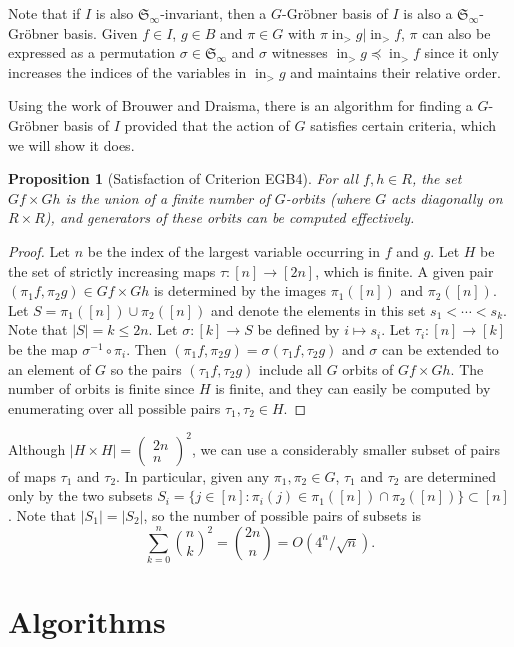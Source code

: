 \documentclass{amsart}
\newtheorem{proposition}[theorem]{Proposition}
\theoremstyle{definition}
\theoremstyle{remark}
\numberwithin{equation}{section}
\newcommand{\binomial}[2]{\left( 
\begin{array}{c} {#1} \\
                        {#2} \end{array} \right)}
\newcommand{\<}{\langle}
\renewcommand{\>}{\rangle}
\newcommand{\LT}{\operatorname{in}_>}
\begin{document}
Note that if $I$ is also ${\mathfrak S}_\infty$-invariant, then a $G$-Gr\"obner basis of $I$ is also a ${\mathfrak S}_\infty$-Gr\"obner basis.  Given $f \in I$, $g \in B$ and $\pi \in G$ with $\pi \LT{g}|\LT{f}$, $\pi$ can also be expressed as a permutation $\sigma \in {\mathfrak S}_\infty$ and $\sigma$ witnesses $\LT{g} \preceq \LT{f}$ since it only increases the indices of the variables in $\LT{g}$ and maintains their relative order.

Using the work of Brouwer and Draisma, there is an algorithm for finding a $G$-Gr\"obner basis of $I$ provided that the action of $G$ satisfies certain criteria, which we will show it does.
\begin{proposition}[Satisfaction of Criterion EGB4]
 For all $f,h \in R$, the set $Gf \times Gh$ is the union of a finite number of $G$-orbits (where $G$ acts diagonally on $R \times R$), and generators of these orbits can be computed effectively.
\end{proposition}
\begin{proof}
 Let $n$ be the index of the largest variable occurring in $f$ and $g$.  Let $H$ be the set of strictly increasing maps $\tau:[n] \to [2n]$, which is finite.  A given pair $(\pi_1 f, \pi_2 g) \in Gf \times Gh$ is determined by the images $\pi_1([n])$ and $\pi_2([n])$.  Let $S = \pi_1([n]) \cup \pi_2([n])$ and denote the elements in this set $s_1 < \cdots < s_k$.  Note that $|S| = k \leq 2n$.  Let $\sigma:[k] \to S$ be defined by $i \mapsto s_i$.  Let $\tau_i:[n] \to [k]$ be the map $\sigma^{-1} \circ \pi_i$.  Then $(\pi_1 f, \pi_2 g) = \sigma(\tau_1 f,\tau_2 g)$ and $\sigma$ can be extended to an element of $G$ so the pairs $(\tau_1 f,\tau_2 g)$ include all $G$ orbits of $Gf \times Gh$.  The number of orbits is finite since $H$ is finite, and they can easily be computed by enumerating over all possible pairs $\tau_1,\tau_2 \in H$.
\end{proof}

Although $|H\times H| = \binomial{2n}{n}^2$, we can use a considerably smaller subset of pairs of maps $\tau_1$ and $\tau_2$.  In particular, given any $\pi_1, \pi_2 \in G$, $\tau_1$ and $\tau_2$ are determined only by the two subsets $S_i = \{j \in [n]: \pi_i(j) \in \pi_1([n]) \cap \pi_2([n])\} \subset [n]$.  Note that $|S_1| = |S_2|$, so the number of possible pairs of subsets is
\[ \sum_{k=0}^n \binom{n}{k}^2 = \binom{2n}{n} = O(4^n/\sqrt{n}). \]


\section{Algorithms}
\end{document}
